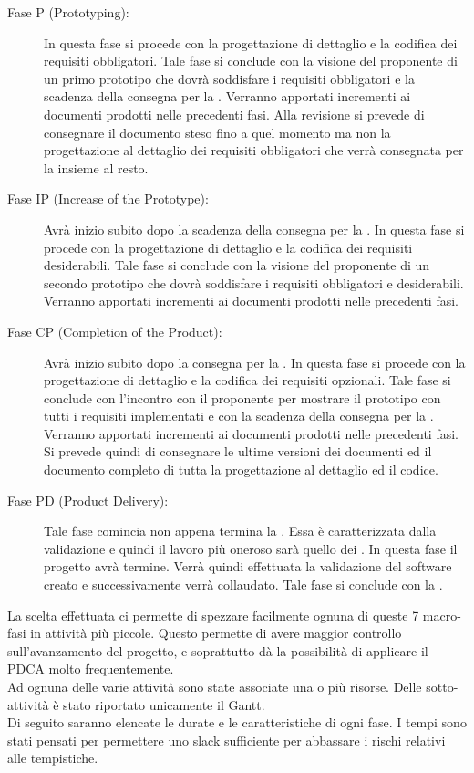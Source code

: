 \begin{description}
		\item[Fase P (Prototyping):] In questa fase si procede con la progettazione di dettaglio e la codifica dei requisiti obbligatori. Tale fase si conclude con la visione del proponente di un primo prototipo che dovrà soddisfare i requisiti obbligatori e la scadenza della consegna per la . Verranno apportati incrementi ai documenti prodotti nelle precedenti fasi. Alla revisione si prevede di consegnare il documento  steso fino a quel momento ma non la progettazione al dettaglio dei requisiti obbligatori che verrà consegnata per la  insieme al resto.
		\item[Fase IP (Increase of the Prototype):] Avrà inizio subito dopo la scadenza della consegna per la . In questa fase si procede con la progettazione di dettaglio e la codifica dei requisiti desiderabili. Tale fase si conclude con la visione del proponente di un secondo prototipo che dovrà soddisfare i requisiti obbligatori e desiderabili. Verranno apportati incrementi ai documenti prodotti nelle precedenti fasi.
		\item[Fase CP (Completion of the Product):] Avrà inizio subito dopo la consegna per la . In questa fase si procede con la progettazione di dettaglio e la codifica dei requisiti opzionali. Tale fase si conclude con l'incontro con il proponente per mostrare il prototipo con tutti i requisiti implementati e con la scadenza della consegna per la . Verranno apportati incrementi ai documenti prodotti nelle precedenti fasi. Si prevede quindi di consegnare le ultime versioni dei documenti ed il documento  completo di tutta la progettazione al dettaglio ed il codice.
		\item[Fase PD (Product Delivery):] Tale fase comincia non appena termina la . Essa è caratterizzata dalla validazione e quindi il lavoro più oneroso sarà quello dei . In questa fase il progetto avrà termine. Verrà quindi effettuata la validazione del software creato e successivamente verrà collaudato. Tale fase si conclude con la .
	\end{description}
	La scelta effettuata ci permette di spezzare facilmente ognuna di queste 7 macro-fasi in attività più piccole. Questo permette di avere maggior controllo sull'avanzamento del progetto, e soprattutto dà la possibilità di applicare il PDCA molto frequentemente.\\Ad ognuna delle varie attività sono state associate una o più risorse. Delle sotto-attività è stato riportato unicamente il Gantt.\\ 
	Di seguito saranno elencate le durate e le caratteristiche di ogni fase. I tempi sono stati pensati per permettere uno slack sufficiente per abbassare i rischi relativi alle tempistiche.
	
	
	
	
	
	
	
	
